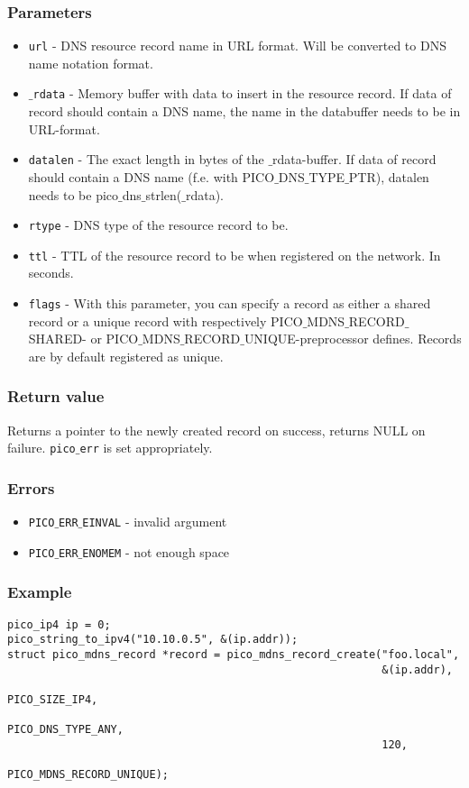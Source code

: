 \subsubsection*{Parameters}
\begin{itemize}[noitemsep]
\item \texttt{url} - DNS resource record name in URL format. Will be converted to DNS name notation format.
\item \texttt{$\_$rdata} - Memory buffer with data to insert in the resource record. If data of record should contain a DNS name, the name in the databuffer needs to be in URL-format.
\item \texttt{datalen} - The exact length in bytes of the $\_$rdata-buffer. If data of record should contain a DNS name (f.e. with PICO$\_$DNS$\_$TYPE$\_$PTR), datalen needs to be pico$\_$dns$\_$strlen($\_$rdata).
\item \texttt{rtype} - DNS type of the resource record to be.
\item \texttt{ttl} - TTL of the resource record to be when registered on the network. In seconds.
\item \texttt{flags} - With this parameter, you can specify a record as either a shared record or a unique record with respectively PICO$\_$MDNS$\_$RECORD$\_$SHARED- or PICO$\_$MDNS$\_$RECORD$\_$UNIQUE-preprocessor defines. Records are by default registered as unique.
\end{itemize}

\subsubsection*{Return value}
Returns a pointer to the newly created record on success, returns NULL on failure. \texttt{pico$\_$err} is set appropriately.

\subsubsection*{Errors}
\begin{itemize}[noitemsep]
\item \texttt{PICO$\_$ERR$\_$EINVAL} - invalid argument
\item \texttt{PICO$\_$ERR$\_$ENOMEM} - not enough space
\end{itemize}

\subsubsection*{Example}
\begin{verbatim}
pico_ip4 ip = 0;
pico_string_to_ipv4("10.10.0.5", &(ip.addr));
struct pico_mdns_record *record = pico_mdns_record_create("foo.local", 
                                                          &(ip.addr),
                                                          PICO_SIZE_IP4,
                                                          PICO_DNS_TYPE_ANY,
                                                          120,
                                                    PICO_MDNS_RECORD_UNIQUE);
\end{verbatim}


